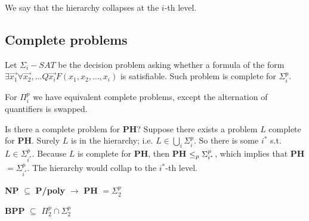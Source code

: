    We say that the hierarchy collapses at the $i$-th level.


\subsection{Complete problems}\label{subsec:ph_complete_problems}
    Let $\Sigma_i-SAT$ be the decision problem asking whether a formula of the form $\exists \vec{x_1} \forall \vec{x_2}, \dots Q \vec{x_i} F(x_1, x_2, \dots, x_i)$ is satisfiable.
    Such problem is complete for $\Sigma_i^p$.

    For $\Pi_i^p$ we have equivalent complete problems, except the alternation of quantifiers is swapped.

    Is there a complete problem for \textbf{PH}?
    Suppose there exists a problem $L$ complete for \textbf{PH}. Surely $L$ is in the hierarchy; i.e. $L \in \bigcup_i \Sigma_i^p$.
    So there is some $i^*$ s.t. $L \in \Sigma_{i^*}^p$.
    Because $L$ is complete for \textbf{PH}, then \textbf{PH} $\leq_p \Sigma_{i^*}^p$, which implies that \textbf{PH}$= \Sigma_{i^*}^p$.
    The hierarchy would collap to the $i^*$-th level.


\begin{theorem}\label{thm:karp_lipton}
    \textbf{NP} $\subseteq$ \textbf{P/poly} $\rightarrow$ \textbf{PH} $= \Sigma_2^p$
\end{theorem}

\begin{theorem}\label{thm:bpp_in_polyhierarchy}
    \textbf{BPP} $\subseteq$ $\Pi_2^p \cap \Sigma_2^p$
\end{theorem}